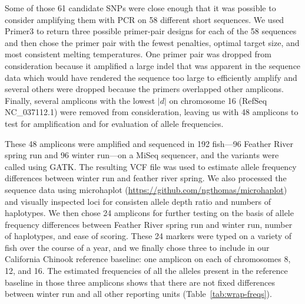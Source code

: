 Some of those 61 candidate SNPs were close enough that it was possible to consider amplifying them
with PCR on 58 different short sequences.  We used Primer3 \citep{untergasser2012primer3} to return
three possible primer-pair designs for each of the 58 sequences and then chose the primer pair
with the fewest penalties, optimal target size, and most consistent
melting temperatures.  One primer pair was dropped from consideration because it
amplified a large indel that was apparent in the sequence data which would have rendered
the sequence too large to efficiently amplify and several others were dropped because the primers
overlapped other amplicons.  Finally, several amplicons with the lowest $|d|$ on chromosome 16
(RefSeq NC\_037112.1) were removed from consideration, leaving us with 48 amplicons to test
for amplification and for evaluation of allele frequencies.

These 48 amplicons were amplified and sequenced in 192 fish---96 Feather River spring run
and 96 winter run---on a MiSeq sequencer, and the variants were called using
GATK.  The resulting VCF file was used to estimate allele frequency differences between
winter run and feather river spring.  We also processed the sequence data using
microhaplot (\url{https://github.com/ngthomas/microhaplot}) and visually inspected
loci for consisten allele depth ratio and numbers of haplotypes.  We then chose 24 amplicons for further
testing on the basis of allele frequency differences between Feather River spring run and
winter run, number of haplotypes, and ease of scoring.  These 24 markers were typed on
a variety of fish over the course of a year, and we finally chose three to include in
our California Chinook reference baseline: one amplicon on each of chromosomes
8, 12, and 16.  The estimated frequencies of all the alleles present in the reference baseline
in those three amplicons shows that there are not fixed differences between
winter run and all other reporting units (Table~\ref{tab:wrap-freqs}).


